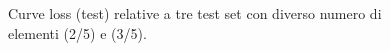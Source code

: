 \documentclass[a4paper,12pt]{article}
\begin{document}
\begin{figure}[htp]
    \centering

    \medskip


    \caption{Curve loss (test) relative a tre test set con diverso numero di elementi (2/5) e (3/5).}
    \label{fig:c2-2}
\end{figure}
\end{document}
